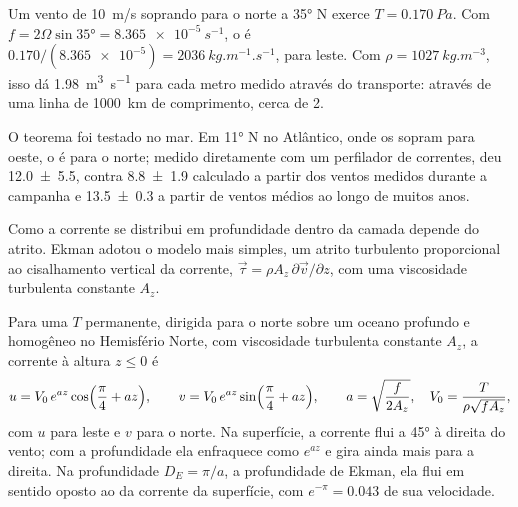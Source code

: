 \begin{example}\label{ex:b1:ocean-circulation:transport}
Um vento de \qty{10}{m/s} soprando para o norte a \ang{35} N exerce
$T = \qty{0.170}{Pa}$. Com $f = 2\Omega\sin\ang{35} = \qty{8.365e-5}{s^{-1}}$, o
 é $0.170/(\num{8.365e-5}) = \qty{2036}{kg.m^{-1}.s^{-1}}$, para
leste. Com $\rho = \qty{1027}{kg.m^{-3}}$, isso dá \qty{1.98}{m^3.s^{-1}} para
cada metro medido através do transporte: através de uma linha de \qty{1000}{km} de comprimento, cerca de
\qty{2}{\sverdrup}.
\end{example}

O teorema foi testado no mar. Em \ang{11} N no Atlântico, onde os
 sopram para oeste, o  é para o norte; medido
diretamente com um perfilador de correntes, deu
\qty[uncertainty-mode=separate]{12.0 \pm 5.5}{\sverdrup}, contra
\qty[uncertainty-mode=separate]{8.8 \pm 1.9}{\sverdrup} calculado a partir dos ventos
medidos durante a campanha e
\qty[uncertainty-mode=separate]{13.5 \pm 0.3}{\sverdrup} a partir de ventos médios ao longo de
muitos anos.

Como a corrente se distribui em profundidade dentro da camada depende do
atrito. Ekman adotou o modelo mais simples, um atrito turbulento proporcional ao
cisalhamento vertical da corrente, $\vec\tau = \rho A_z\,\partial\vec v/\partial z$, com
uma viscosidade turbulenta constante $A_z$.

\begin{proposition}\label{prop:b1:ocean-circulation:spiral}
Para uma  $T$ permanente, dirigida para o norte sobre um oceano profundo e homogêneo no
Hemisfério Norte, com viscosidade turbulenta constante $A_z$, a corrente à altura $z
\leq 0$ é
\[
  u = V_0\,e^{az}\cos\Bigl(\frac\pi4 + az\Bigr),\qquad
  v = V_0\,e^{az}\sin\Bigl(\frac\pi4 + az\Bigr),\qquad
  a = \sqrt{\frac{f}{2A_z}},\quad V_0 = \frac{T}{\rho\sqrt{fA_z}},
\]
com $u$ para leste e $v$ para o norte. Na superfície, a corrente flui a \ang{45} à
direita do vento; com a profundidade ela enfraquece como $e^{az}$ e gira ainda mais para a
direita. Na profundidade $D_E = \pi/a$, a profundidade de Ekman, ela flui em sentido
oposto ao da corrente da superfície, com $e^{-\pi} = \num{0.043}$ de sua velocidade.
\end{proposition}
\admitted

